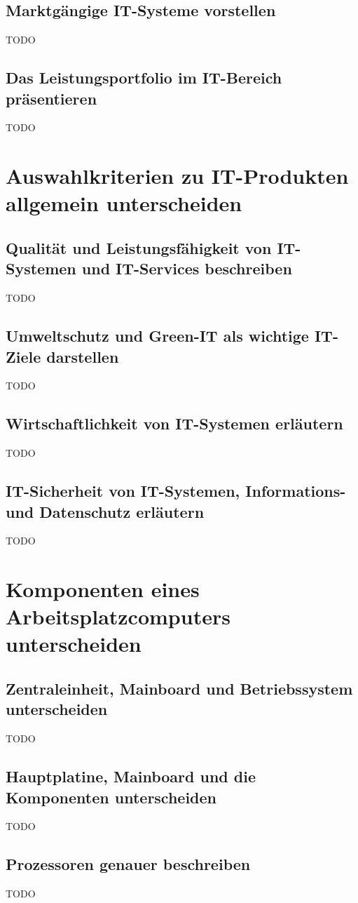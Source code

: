 \documentclass[11pt]{article}
\begin{document}
\subsection{Marktgängige IT-Systeme vorstellen}
    TODO
\subsection{Das Leistungsportfolio im IT-Bereich präsentieren}
    TODO

\newpage
\section{Auswahlkriterien zu IT-Produkten allgemein unterscheiden}
\subsection{Qualität und Leistungsfähigkeit von IT-Systemen und IT-Services beschreiben}
    TODO
\subsection{Umweltschutz und Green-IT als wichtige IT-Ziele darstellen}
    TODO
\subsection{Wirtschaftlichkeit von IT-Systemen erläutern}
    TODO
\subsection{IT-Sicherheit von IT-Systemen, Informations- und Datenschutz erläutern}
    TODO

\newpage
\section{Komponenten eines Arbeitsplatzcomputers unterscheiden}
\subsection{Zentraleinheit, Mainboard und Betriebssystem unterscheiden}
    TODO
\subsection{Hauptplatine, Mainboard und die Komponenten unterscheiden}
    TODO
\subsection{Prozessoren genauer beschreiben}
    TODO
\end{document}
